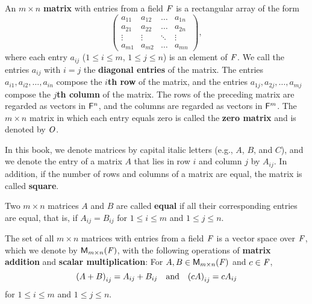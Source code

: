 \begin{defn}\label{1.2.6}
	An \(m \times n\) \textbf{matrix} with entries from a field \(\mathit{F}\) is a rectangular array of the form
	\[
		\begin{pmatrix}
			a_{1 1} & a_{1 2} & \dots  & a_{1 n} \\
			a_{2 1} & a_{2 2} & \dots  & a_{2 n} \\
			\vdots  & \vdots  & \ddots & \vdots  \\
			a_{m 1} & a_{m 2} & \dots  & a_{m n}
		\end{pmatrix},
	\]
	where each entry \(a_{i j}\) (\(1 \leq i \leq m\), \(1 \leq j \leq n\)) is an element of \(\mathit{F}\).
	We call the entries \(a_{i j}\) with \(i = j\) the \textbf{diagonal entries} of the matrix.
	The entries \(a_{i 1} ,a_{i 2} , \dots, a_{i n}\) compose the \textbf{\(i\)th row} of the matrix, and the entries \(a_{1 j}, a_{2 j}, \dots, a_{m j}\) compose the \textbf{\(j\)th column} of the matrix.
	The rows of the preceding matrix are regarded as vectors in \(\mathsf{F}^{n}\), and the columns are regarded as vectors in \(\mathsf{F}^{m}\).
	The \(m \times n\) matrix in which each entry equals zero is called the \textbf{zero matrix} and is denoted by \(\mathit{O}\).
\end{defn}

\begin{defn}\label{1.2.7}
	In this book, we denote matrices by capital italic letters (e.g., \(A\), \(B\), and \(C\)), and we denote the entry of a matrix \(A\) that lies in row \(i\) and column \(j\) by \(A_{i j}\).
	In addition, if the number of rows and columns of a matrix are equal, the matrix is called \textbf{square}.
\end{defn}

\begin{defn}\label{1.2.8}
	Two \(m \times n\) matrices \(A\) and \(B\) are called \textbf{equal} if all their corresponding entries are equal, that is, if \(A_{i j} = B_{i j}\) for \(1 \leq i \leq m\) and \(1 \leq j \leq n\).
\end{defn}

\begin{eg}\label{1.2.9}
	The set of all \(m \times n\) matrices with entries from a field \(\mathit{F}\) is a vector space over \(\mathit{F}\), which we denote by \(\mathsf{M}_{{m} \times n}({\mathit{F}})\), with the following operations of \textbf{matrix addition} and \textbf{scalar multiplication}:
	For \(A, B \in \mathsf{M}_{{m} \times n}({\mathit{F}})\) and \(c \in \mathit{F}\),
	\[
		\p{A + B}_{i j} = A_{i j} + B_{i j} \quad \text{and} \quad \p{c A}_{i j} = c A_{i j}
	\]
	for \(1 \leq i \leq m\) and \(1 \leq j \leq n\).
\end{eg}

